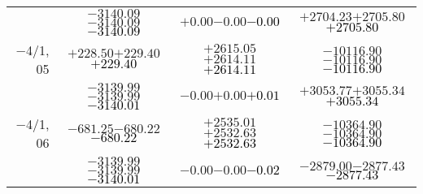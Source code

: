 \documentclass[compress]{beamer}
\begin{document}
\begin{frame}
{\begin{tabular}{r | c | c | c}
           & $-3140.09$\hspace{0.1 cm}$-3140.09$\hspace{0.1 cm}\textcolor{black}{$-3140.09$} & $+0.00$\hspace{0.1 cm}$-0.00$\hspace{0.1 cm}\textcolor{black}{$-0.00$} & $+2704.23$\hspace{0.1 cm}$+2705.80$\hspace{0.1 cm}\textcolor{black}{$+2705.80$} \\
$-$4/1, 05 & $+228.50$\hspace{0.1 cm}$+229.40$\hspace{0.1 cm}\textcolor{black}{$+229.40$} & $+2615.05$\hspace{0.1 cm}$+2614.11$\hspace{0.1 cm}\textcolor{black}{$+2614.11$} & $-10116.90$\hspace{0.1 cm}$-10116.90$\hspace{0.1 cm}\textcolor{black}{$-10116.90$} \\
           & $-3139.99$\hspace{0.1 cm}$-3139.99$\hspace{0.1 cm}\textcolor{black}{$-3140.01$} & $-0.00$\hspace{0.1 cm}$+0.00$\hspace{0.1 cm}\textcolor{black}{$+0.01$} & $+3053.77$\hspace{0.1 cm}$+3055.34$\hspace{0.1 cm}\textcolor{black}{$+3055.34$} \\
$-$4/1, 06 & $-681.25$\hspace{0.1 cm}$-680.22$\hspace{0.1 cm}\textcolor{black}{$-680.22$} & $+2535.01$\hspace{0.1 cm}$+2532.63$\hspace{0.1 cm}\textcolor{black}{$+2532.63$} & $-10364.90$\hspace{0.1 cm}$-10364.90$\hspace{0.1 cm}\textcolor{black}{$-10364.90$} \\
           & $-3139.99$\hspace{0.1 cm}$-3139.99$\hspace{0.1 cm}\textcolor{black}{$-3140.01$} & $-0.00$\hspace{0.1 cm}$-0.00$\hspace{0.1 cm}\textcolor{black}{$-0.02$} & $-2879.00$\hspace{0.1 cm}$-2877.43$\hspace{0.1 cm}\textcolor{black}{$-2877.43$} \\
\end{tabular}}
\end{frame}
\end{document}
